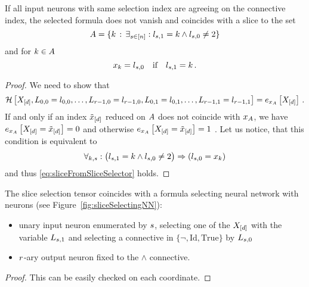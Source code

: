 \begin{lemma}\label{lem:sliceFromSliceSelector}
	If all input neurons with same selection index are agreeing on the connective index, the selected formula does not vanish and coincides with a slice to the set
		\[ A = \{ k \, : \, \exists_{s\in[n]}: l_{s,1} = k \land l_{s,0} \neq 2 \} \]
	and for $k\in A$
		\[ x_{k} = l_{s,0} \quad \text{if} \quad l_{s,1} = k \, . \]
\end{lemma}
\begin{proof}
	We need to show that 
	\begin{align}\label{eq:sliceFromSliceSelector}
	  	\mathcal{H}\left[X_{[d]},L_{0,0}=l_{0,0},\ldots,L_{r-1,0}=l_{r-1,0},L_{0,1}=l_{0,1},\ldots,L_{r-1,1}=l_{r-1,1}\right] = e_{x_{A}}\left[X_{[d]}\right] \, . 
	\end{align}
	If and only if an index $\tilde{x}_{[d]}$ reduced on $A$ does not coincide with $x_{A}$, we have $e_{x_{A}}\left[X_{[d]}=\tilde{x}_{[d]}\right]=0$ and otherwise $e_{x_{A}}\left[X_{[d]}=\tilde{x}_{[d]}\right]=1$ .
	Let us notice, that this condition is equivalent to 
		\[ \forall_{k,s} : \big(  l_{s,1} = k \land l_{s,0} \neq 2 \big) \Rightarrow  (l_{s,0} = x_{k}) \]
	and thus \eqref{eq:sliceFromSliceSelector} holds.
\end{proof}


\begin{lemma}\label{lem:fsnnRepresentingSliceSelector}
	The slice selection tensor coincides with a formula selecting neural network with neurons (see Figure~\ref{fig:sliceSelectingNN}):
	\begin{itemize}
		\item unary input neuron enumerated by $s$, selecting one of the $X_{[d]}$ with the variable $L_{s,1}$ and selecting a connective in $\{\lnot, \mathrm{Id}, \mathrm{True}\}$ by $L_{s,0}$
		\item $r$-ary output neuron fixed to the $\land$ connective.
	\end{itemize}
\end{lemma}
\begin{proof}
	This can be easily checked on each coordinate.
\end{proof}

